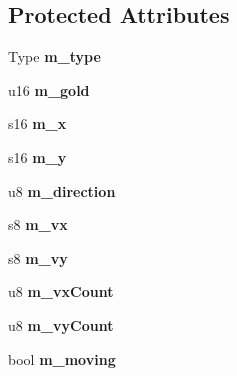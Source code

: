 \subsection*{Protected Attributes}
\begin{DoxyCompactItemize}
\item 
\hypertarget{classCharacter_a6aaa1409045cb7ce01b572045d082a6a}{Type {\bfseries m\-\_\-type}}\label{classCharacter_a6aaa1409045cb7ce01b572045d082a6a}

\item 
\hypertarget{classCharacter_a94bab35d6f9228f3cd616ddebe2ca569}{u16 {\bfseries m\-\_\-gold}}\label{classCharacter_a94bab35d6f9228f3cd616ddebe2ca569}

\item 
\hypertarget{classCharacter_a12510f0745da930f9565ab0a734708e5}{s16 {\bfseries m\-\_\-x}}\label{classCharacter_a12510f0745da930f9565ab0a734708e5}

\item 
\hypertarget{classCharacter_a1a5f95568f3302a33d581efa4273df04}{s16 {\bfseries m\-\_\-y}}\label{classCharacter_a1a5f95568f3302a33d581efa4273df04}

\item 
\hypertarget{classCharacter_a0e2c0871027ec614f2a7d4e283e9328f}{u8 {\bfseries m\-\_\-direction}}\label{classCharacter_a0e2c0871027ec614f2a7d4e283e9328f}

\item 
\hypertarget{classCharacter_a43300a0a04dbc6dce4d97cd3d4967c51}{s8 {\bfseries m\-\_\-vx}}\label{classCharacter_a43300a0a04dbc6dce4d97cd3d4967c51}

\item 
\hypertarget{classCharacter_a61aa395b3bdfa499f1b32e7ab07b03ef}{s8 {\bfseries m\-\_\-vy}}\label{classCharacter_a61aa395b3bdfa499f1b32e7ab07b03ef}

\item 
\hypertarget{classCharacter_afd4b17ed386481e343d5cc819621e211}{u8 {\bfseries m\-\_\-vx\-Count}}\label{classCharacter_afd4b17ed386481e343d5cc819621e211}

\item 
\hypertarget{classCharacter_aa3dab763ecc28e54e8ffcfd1b67197dc}{u8 {\bfseries m\-\_\-vy\-Count}}\label{classCharacter_aa3dab763ecc28e54e8ffcfd1b67197dc}

\item 
\hypertarget{classCharacter_aab07806fe827950f1b7a20be09b57ab9}{bool {\bfseries m\-\_\-moving}}\label{classCharacter_aab07806fe827950f1b7a20be09b57ab9}


\end{DoxyCompactItemize}
